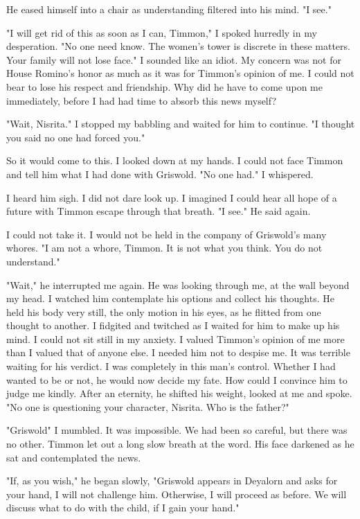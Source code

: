 \documentclass{article}
\begin{document}
He eased himself into a chair as understanding filtered into his mind. "I see."

"I will get rid of this as soon as I can, Timmon," I spoked hurredly in my desperation. "No one need know. The women's tower is discrete in these matters. Your family will not lose face." I sounded like an idiot. My concern was not for House Romino's honor as much as it was for Timmon's opinion of me. I could not bear to lose his respect and friendship. Why did he have to come upon me immediately, before I had had time to absorb this news myself?

"Wait, Nisrita." I stopped my babbling and waited for him to continue. "I thought you said no one had forced you."

So it would come to this. I looked down at my hands. I could not face Timmon and tell him what I had done with Griswold. "No one had." I whispered. 

I heard him sigh. I did not dare look up. I imagined I could hear all hope of a future with Timmon escape through that breath. "I see." He said again.

I could not take it. I would not be held in the company of  Griswold's many whores. "I am not a whore, Timmon. It is not what you think. You do not understand."

"Wait," he interrupted me again. He was looking through me, at the wall beyond my head. I watched him contemplate his options and collect his thoughts. He held his body very still, the only motion in his eyes, as he flitted from one thought to another. I fidgited and twitched as I waited for him to make up his mind. I could not sit still in my anxiety. I valued Timmon's opinion of me more than I valued that of anyone else. I needed him not to despise me. It was terrible waiting for his verdict. I was completely in this man's control. Whether I had wanted to be or not, he would now decide my fate. How could I convince him to judge me kindly. After an eternity, he shifted his weight, looked at me and spoke. "No one is questioning your character, Nisrita. Who is the father?"

"Griswold" I mumbled. It was impossible. We had been so careful, but there was no other. Timmon let out a long slow breath at the word. His face darkened as he sat and contemplated the news.

"If, as you wish," he began slowly, "Griswold appears in Deyalorn and asks for your hand, I will not challenge him. Otherwise, I will proceed as before. We will discuss what to do with the child, if I gain your hand."
\end{document}
